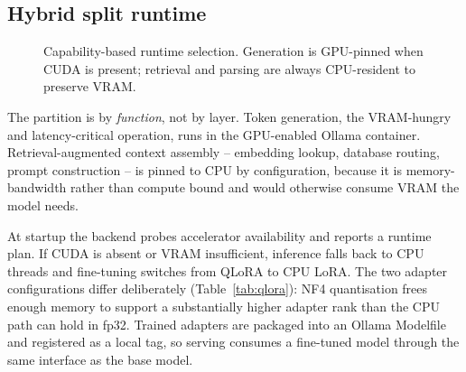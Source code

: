 \documentclass[preprint,12pt,authoryear]{elsarticle}
\begin{document}
\subsection{Hybrid split runtime}
\label{ssec:runtime}

\begin{figure}[t]\centering
{}
\caption{Capability-based runtime selection. Generation is GPU-pinned when CUDA
is present; retrieval and parsing are always CPU-resident to preserve VRAM.}
\label{fig:runtime}
\end{figure}

The partition is by \emph{function}, not by layer. Token generation, the
VRAM-hungry and latency-critical operation, runs in the GPU-enabled Ollama
container. Retrieval-augmented context assembly -- embedding lookup, database
routing, prompt construction -- is pinned to CPU by configuration, because it is
memory-bandwidth rather than compute bound and would otherwise consume VRAM the
model needs.

At startup the backend probes accelerator availability and reports a runtime
plan. If CUDA is absent or VRAM insufficient, inference falls back to CPU threads
and fine-tuning switches from QLoRA to CPU LoRA. The two adapter configurations
differ deliberately (Table~\ref{tab:qlora}): NF4 quantisation frees enough memory
to support a substantially higher adapter rank than the CPU path can hold in
fp32. Trained adapters are packaged into an Ollama Modelfile and registered as a
local tag, so serving consumes a fine-tuned model through the same interface as
the base model.
\end{document}
